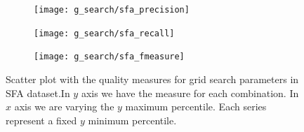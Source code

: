 \clearpage %
\begin{figure}[!htb]
    \centering
    \begin{subfigure}[t]{0.95\textwidth}
        \texttt{[image: g\_search/sfa\_precision]}
    \end{subfigure}
    \begin{subfigure}[t]{0.95\textwidth}
        \texttt{[image: g\_search/sfa\_recall]}
    \end{subfigure}
    \begin{subfigure}[t]{0.95\textwidth}
        \texttt{[image: g\_search/sfa\_fmeasure]}
    \end{subfigure}
    \caption[Scatter plot with the quality measures for grid search parameters in SFA dataset]{Scatter plot with the quality measures for grid search parameters in SFA dataset.In $y$ axis we have the measure for each combination. In $x$ axis we are varying the $y$ maximum percentile. Each series represent a fixed $y$ minimum percentile.}
    \label{fig:sfa_g_search}
\end{figure}